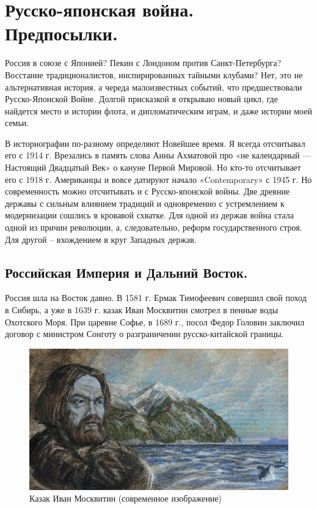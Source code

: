 
\chapter{Русско-японская война.  Предпосылки.}

Россия в союзе с Японией? Пекин с Лондоном против Санкт-Петербурга? Восстание традиционалистов, инспирированных тайными клубами? Нет, это не альтернативная история, а череда малоизвестных событий, что предшествовали Русско-Японской Войне. Долгой присказкой я открываю новый цикл, где найдется место и истории флота, и дипломатическим играм, и даже истории моей семьи.

В историографии по-разному определяют Новейшее время. Я всегда отсчитывал его с 1914 г. Врезались в память слова Анны Ахматовой про «не календарный — Настоящий Двадцатый Век» о кануне Первой Мировой. Но кто-то отсчитывает его с 1918 г. Американцы и вовсе датируют начало «Contemporary» с 1945 г.
Но современность можно отсчитывать и с Русско-японской войны. Две древние державы с сильным влиянием традиций и одновременно с устремлением к модернизации сошлись в кровавой схватке. Для одной из держав война стала одной из причин революции, а, следовательно, реформ государственного строя. Для другой – вхождением в круг Западных держав.

\section{Российская Империя и Дальний Восток.}

Россия шла на Восток давно. В 1581 г. Ермак Тимофеевич совершил свой поход в Сибирь, а уже в 1639 г. казак Иван Москвитин смотрел в пенные воды Охотского Моря. При царевне Софье, в 1689 г., посол Федор Головин заключил договор с министром Сонготу о разграничении русско-китайской границы.

\begin{figure}[h!tb] 
	\centering\includegraphics[scale=0.3]{Data/RYAV_predposylki/scRafIMHAjs.jpg}
	\caption{Казак Иван Москвитин (современное изображение)}%
\end{figure}

